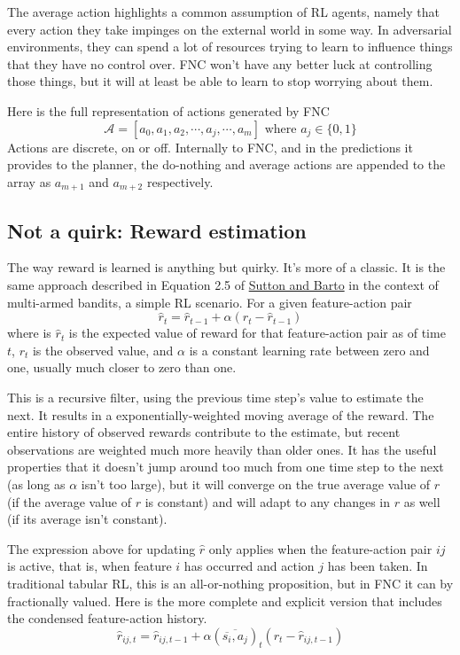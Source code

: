 The average action highlights a common assumption of RL agents, namely
that every action they take impinges on the external world in some way.
In adversarial environments, they can spend a lot of resources trying
to learn to influence things that they have no control over. FNC
won’t have any better luck at controlling those things, but it will
at least be able to learn to stop worrying about them.

Here is the full representation of actions generated by FNC 
\begin{equation}
\mathcal{A} = [a_0, a_1, a_2, \cdots, a_j, \cdots, a_m]
\mbox{ where } a_j \in \{0, 1\} 
\end{equation}
Actions are discrete, on or off. Internally to FNC, and in the predictions
it provides to the planner, the do-nothing and average actions are appended
to the array as $a_{m+1}$ and $a_{m+2}$ respectively.

\subsection*{Not a quirk: Reward estimation}
\label{algorewards}

The way reward is learned is anything but quirky. It's more of a classic.
It is the same approach described in
Equation 2.5 of \href{http://incompleteideas.net/book/RLbook2020.pdf}{Sutton and Barto}
in the context of multi-armed bandits, a simple RL scenario.
For a given feature-action pair
\begin{equation}
\hat{r}_t = \hat{r}_{t-1} + \alpha(r_t - \hat{r}_{t-1})
\end{equation}
where is $\hat{r}_t$ is the expected value of reward for that
feature-action pair as of time $t$, $r_t$ is the observed value,
and $\alpha$ is a constant learning rate between zero and one,
usually much closer to zero than one.

This is a recursive filter, using the previous time step's value to
estimate the next. It results in a exponentially-weighted moving average
of the reward. The entire history of observed rewards contribute to the
estimate, but recent observations are weighted much more heavily than older ones.
It has the useful properties that it doesn't jump around too much from one
time step to the next (as long as $\alpha$ isn't too large), but it will
converge on the true average value of $r$ (if the average value of $r$
is constant) and will adapt
to any changes in $r$ as well (if its average isn't constant).

The expression above for updating $\hat{r}$ only applies when the feature-action
pair $ij$ is active, that is, when feature $i$ has occurred and action $j$ has been
taken. In traditional tabular RL, this is an all-or-nothing proposition, but
in FNC it can by fractionally valued.
Here is the more complete
and explicit version that includes the condensed feature-action history.
\begin{equation}
\hat{r}_{ij, t} = \hat{r}_{ij, t-1} + \alpha
(\overline{\overline{s_i}, a_j})_t
(r_t - \hat{r}_{ij, t-1})
\end{equation}

